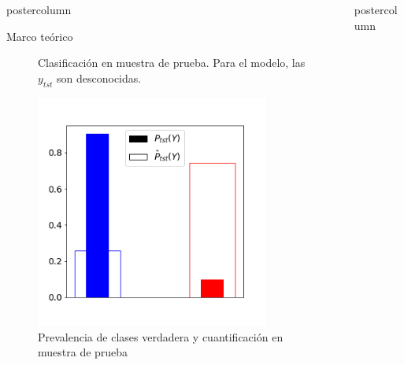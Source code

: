 \documentclass{beamer}
\newlength{\columnheight}
\begin{document}
\begin{frame}
\begin{columns}
\begin{column}{.43\textwidth}
\begin{beamercolorbox}[center]{postercolumn}
\begin{minipage}{.98\textwidth}
{\begin{myblock}{Marco teórico}
\begin{figure}
\begin{minipage}{0.45\textwidth}
								\caption{Clasificación en muestra de prueba. Para el modelo, las
								$y_{tst}$ son desconocidas.}
							\end{minipage}
							\hfill
							\begin{minipage}{0.45\textwidth}
								\centering\includegraphics[width=0.85\textwidth]{../plots_teoria/cambios_test_barplot.png}
								\caption{Prevalencia de clases verdadera y cuantificación en muestra de
								prueba}
							\end{minipage}
						\end{figure}
					\end{myblock}\vfill

		}\end{minipage}\end{beamercolorbox}
	\end{column}

	\begin{column}{.57\textwidth}
		\begin{beamercolorbox}[center]{postercolumn}
			\begin{minipage}{.98\textwidth} %
				\parbox[t][\columnheight]{\textwidth}{ %

}
\end{minipage}
\end{beamercolorbox}
\end{column}
\end{columns}
\end{frame}
\end{document}
